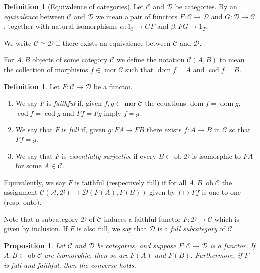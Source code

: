 \documentclass{report}
\DeclareMathOperator{\ob}{ob}
\DeclareMathOperator{\mor}{mor}
\DeclareMathOperator{\dom}{dom}
\DeclareMathOperator{\cod}{cod}
\theoremstyle{definition}
\theoremstyle{plain}
\newtheorem{prop}[thm]{Proposition}
\theoremstyle{definition}
\newtheorem{defn}[thm]{Definition}
\begin{document}
	\begin{defn}[Equivalence of categories]
		Let $\mathcal{C}$ and $\mathcal{D}$ be categories. By an \emph{equivalence} between $\mathcal{C}$ and $\mathcal{D}$ we mean a pair of functors $F\colon \mathcal{C}\to\mathcal{D}$ and $G\colon \mathcal{D} \to \mathcal{C}$, together with natural isomorphisms $\alpha\colon 1_{\mathcal{C}} \to GF$ and $\beta \colon FG \to 1_{\mathcal{D}}$.
		
		We write $\mathcal{C}\simeq \mathcal{D}$ if there exists an equivalence between $\mathcal{C}$ and $\mathcal{D}$.
	\end{defn}
	For $A,B$ objects of some category $\mathcal{C}$ we define the notation $\mathcal{C}(A,B)$ to mean the collection of morphisms $f\in\mor\mathcal{C}$ such that $\dom f = A$ and $\cod f = B$.
	\begin{defn}
		Let $F\colon\mathcal{C}\to\mathcal{D}$ be a functor.
		\begin{enumerate}[label=(\alph*)]
			\item We say $F$ is \emph{faithful} if, given $f,g\in\mor \mathcal{C}$ the equations $\dom f = \dom g$, $\cod f = \cod g$ and $Ff = Fg$ imply $f = g$. 
			\item We say that $F$ is \emph{full} if, given $g\colon FA\to FB$ there exists $f\colon A \to B$ in $\mathcal{C}$ so that $Ff = g$.
			\item We say that $F$ is \emph{essentially surjective} if every $B\in\ob \mathcal{D}$ is isomorphic to $FA$ for some $A\in\mathcal{C}$.
		\end{enumerate}
		Equivalently, we say $F$ is faithful (respectively full) if for all $A,B\ \ob\mathcal{C}$ the assignment $\mathcal{C(A,B)} \to \mathcal{D}(F(A),F(B))$ given by $f\mapsto Ff$ is one-to-one (resp. onto).
	\end{defn}
	Note that a subcategory $\mathcal{D}$ of $\mathcal{C}$ induces a faithful functor $F\colon \mathcal{D} \to \mathcal{C}$ which is given by inclusion. If $F$ is also full, we say that $\mathcal{D}$ is a \emph{full subcategory} of $\mathcal{C}$.
	\begin{prop}
		Let $\mathcal{C}$ and $\mathcal{D}$ be categories, and suppose $F \colon\mathcal{C}\to\mathcal{D}$ is a functor. If $A,B\in\ob\mathcal{C}$ are isomorphic, then so are $F(A)$ and $F(B)$. Furthermore, if $F$ is full and faithful, then the converse holds. 
	\end{prop}
\end{document}
